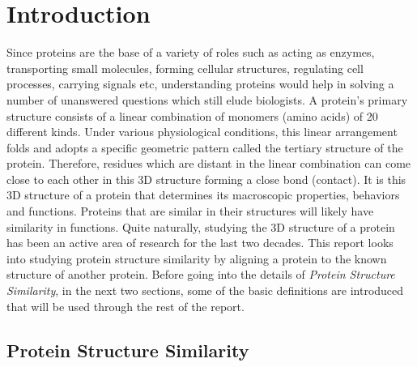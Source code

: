 \chapter{Introduction}

Since proteins are the base of a variety of roles such as acting as enzymes, transporting small molecules, forming cellular structures, regulating cell processes, carrying signals etc, understanding proteins would help in solving a number of unanswered questions which still elude biologists. A protein's primary structure consists of a linear combination of monomers (amino acids) of 20 different kinds. Under various physiological conditions, this linear arrangement folds and adopts a specific geometric pattern called the tertiary structure of the protein. Therefore, residues which are distant in the linear combination can come close to each other in this 3D structure forming a close bond (contact). It is this 3D structure of a protein that determines its macroscopic properties, behaviors and functions. Proteins that are similar in their structures will likely have similarity in functions. Quite naturally, studying the 3D structure of a protein has been an active area of research for the last two decades. This report looks into studying protein structure similarity by aligning a protein to the known structure of another protein. Before going into the details of {\it Protein Structure Similarity}, in the next two sections, some of the basic definitions are introduced that will be used through the rest of the report.

\section{Protein Structure Similarity}

